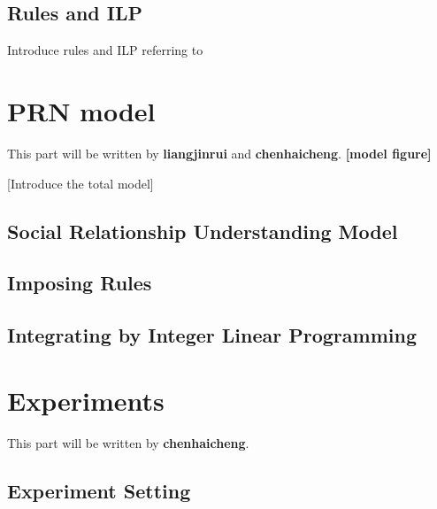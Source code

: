 \documentclass{article}
\begin{document}
\subsection{Rules and ILP}

Introduce rules and ILP referring to \cite{DBLP:conf/ijcai/WangWG15}



\section{PRN model}
This part will be written by {\bf liangjinrui} and {\bf chenhaicheng}.
{\bf [model figure]}

[Introduce the total model]

\subsection{Social Relationship Understanding Model}
\subsection{Imposing Rules}
\subsection{Integrating by Integer Linear Programming}


\section{Experiments}

This part will be written by {\bf chenhaicheng}.
\subsection{Experiment Setting}
\end{document}

